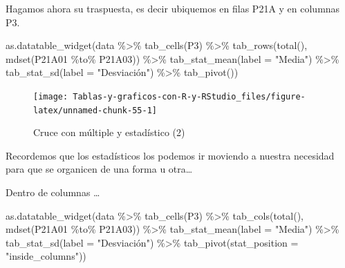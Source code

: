 \documentclass[
]{book}
\newenvironment{Shaded}{\begin{snugshade}}{\end{snugshade}}
\newcommand{\AttributeTok}[1]{\textcolor[rgb]{0.77,0.63,0.00}{#1}}
\newcommand{\FunctionTok}[1]{\textcolor[rgb]{0.00,0.00,0.00}{#1}}
\newcommand{\NormalTok}[1]{#1}
\newcommand{\SpecialCharTok}[1]{\textcolor[rgb]{0.00,0.00,0.00}{#1}}
\newcommand{\StringTok}[1]{\textcolor[rgb]{0.31,0.60,0.02}{#1}}
\begin{document}
Hagamos ahora su traspuesta, es decir ubiquemos en filas P21A y en columnas P3.

\begin{Shaded}
\begin{Highlighting}[]
\FunctionTok{as.datatable\_widget}\NormalTok{(data }\SpecialCharTok{\%\textgreater{}\%}
  \FunctionTok{tab\_cells}\NormalTok{(P3) }\SpecialCharTok{\%\textgreater{}\%}
  \FunctionTok{tab\_rows}\NormalTok{(}\FunctionTok{total}\NormalTok{(), }\FunctionTok{mdset}\NormalTok{(P21A01 }\SpecialCharTok{\%to\%}\NormalTok{ P21A03)) }\SpecialCharTok{\%\textgreater{}\%}
  \FunctionTok{tab\_stat\_mean}\NormalTok{(}\AttributeTok{label =} \StringTok{"Media"}\NormalTok{) }\SpecialCharTok{\%\textgreater{}\%}
  \FunctionTok{tab\_stat\_sd}\NormalTok{(}\AttributeTok{label =} \StringTok{"Desviación"}\NormalTok{) }\SpecialCharTok{\%\textgreater{}\%}
  \FunctionTok{tab\_pivot}\NormalTok{())}
\end{Highlighting}
\end{Shaded}

\begin{figure}[H]

{\centering \texttt{[image: Tablas-y-graficos-con-R-y-RStudio\_files/figure-latex/unnamed-chunk-55-1]} 

}

\caption{Cruce con múltiple y estadístico (2)}\label{fig:unnamed-chunk-55}
\end{figure}

Recordemos que los estadísticos los podemos ir moviendo a nuestra necesidad para que se organicen de una forma u otra\ldots{}

Dentro de columnas \ldots{}

\begin{Shaded}
\begin{Highlighting}[]
\FunctionTok{as.datatable\_widget}\NormalTok{(data }\SpecialCharTok{\%\textgreater{}\%}
  \FunctionTok{tab\_cells}\NormalTok{(P3) }\SpecialCharTok{\%\textgreater{}\%}
  \FunctionTok{tab\_cols}\NormalTok{(}\FunctionTok{total}\NormalTok{(), }\FunctionTok{mdset}\NormalTok{(P21A01 }\SpecialCharTok{\%to\%}\NormalTok{ P21A03)) }\SpecialCharTok{\%\textgreater{}\%}
  \FunctionTok{tab\_stat\_mean}\NormalTok{(}\AttributeTok{label =} \StringTok{"Media"}\NormalTok{) }\SpecialCharTok{\%\textgreater{}\%}
  \FunctionTok{tab\_stat\_sd}\NormalTok{(}\AttributeTok{label =} \StringTok{"Desviación"}\NormalTok{) }\SpecialCharTok{\%\textgreater{}\%}
  \FunctionTok{tab\_pivot}\NormalTok{(}\AttributeTok{stat\_position =} \StringTok{"inside\_columns"}\NormalTok{))}
\end{Highlighting}
\end{Shaded}
\end{document}

